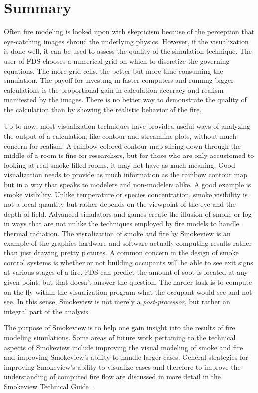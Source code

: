 \documentclass[11pt,twoside]{book}
\begin{document}
\chapter{Summary}
Often fire modeling is looked upon with skepticism because of the
perception that eye-catching images shroud the underlying physics.
However, if the visualization is done well, it can be used to
assess the quality of the simulation technique. The user of FDS
chooses a numerical grid on which to discretize the governing
equations. The more grid cells, the better but more time-consuming
the simulation. The payoff for investing in faster computers and
running bigger calculations is the proportional gain in calculation accuracy and realism
manifested by the images. There is no better way to demonstrate
the quality of the calculation than by showing the realistic
behavior of the fire.

Up to now, most visualization techniques have provided useful ways
of analyzing the output of a calculation, like contour and
streamline plots, without much concern for realism. A
rainbow-colored contour map slicing down through the middle of a
room is fine for researchers, but for those who are only
accustomed to looking at real smoke-filled rooms, it may not have
as much meaning. Good visualization needs to provide as much
information as the rainbow contour map but in a way that speaks to
modelers and non-modelers alike. A good example is smoke
visibility. Unlike temperature or species concentration, smoke
visibility is not a local quantity but rather depends on the
viewpoint of the eye and the depth of field. Advanced simulators
and games create the illusion of smoke or fog in ways that are not
unlike the techniques employed by fire models to handle thermal
radiation. The visualization of smoke and fire by Smokeview is an
example of the graphics hardware and software actually computing
results rather than just drawing pretty pictures. A common concern
in the design of smoke control systems is whether or not building
occupants will be able to see exit signs at various stages of a
fire. FDS can predict the amount of soot is located at any given
point, but that doesn't answer the question. The harder task is to
compute on the fly within the visualization program what the
occupant would see and not see. In this sense, Smokeview is not
merely a {\em post-processor}, but rather an integral part of the
analysis.

The purpose of Smokeview is to help one gain insight into the results
of fire modeling simulations.
Some areas of future work pertaining to the technical aspects of
Smokeview include improving the visual modeling of smoke and fire
and improving Smokeview's ability to handle larger cases.
General strategies for improving Smokeview's ability to visualize
cases and therefore to improve the understanding of computed fire
flow are discussed in more detail in the
Smokeview Technical Guide~\cite{Smokeview_Tech_Guide}.
\end{document}
